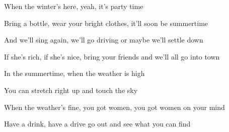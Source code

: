 \begin{song}
\bigskip


When the winter's here, yeah, it's party time \par
Bring a bottle, wear your bright clothes, it'll soon be summertime \par
And we'll sing again, we'll go driving or maybe we'll settle down \par
If she's rich, if she's nice, bring your friends and we'll all go into town \par

\bigskip

In the summertime, when the weather is high \par
You can stretch right up and touch the sky \par
When the weather's fine, you got women, you got women on your mind \par
Have a drink, have a drive go out and see what you can find \par

\end{song}